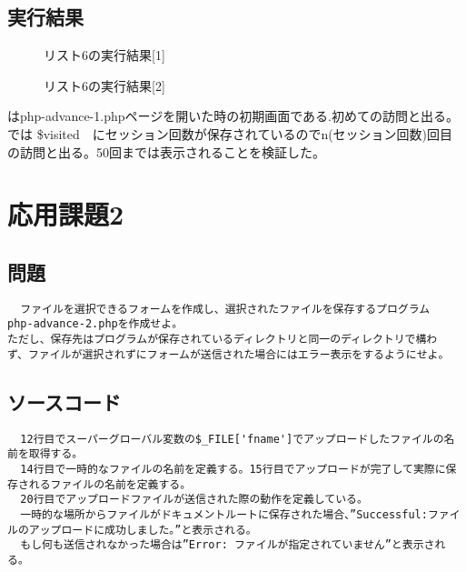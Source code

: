 \documentclass[a4j,10pt]{jsarticle}
\begin{document}
\subsection{実行結果}

\begin{figure}[H]
  \centering
  \caption{リスト6の実行結果[1]}
\label{fig:ad1}
\end{figure}

\begin{figure}[H]
  \centering
  \caption{リスト6の実行結果[2]}
\label{fig:ad2}
\end{figure}


はphp-advance-1.phpページを開いた時の初期画面である.初めての訪問と出る。
では \$visited　にセッション回数が保存されているのでn(セッション回数)回目の訪問と出る。50回までは表示されることを検証した。


\section{応用課題2}

\subsection{問題}

\begin{verbatim}
  ファイルを選択できるフォームを作成し、選択されたファイルを保存するプログラム
php-advance-2.phpを作成せよ。
ただし、保存先はプログラムが保存されているディレクトリと同一のディレクトリで構わ
ず、ファイルが選択されずにフォームが送信された場合にはエラー表示をするようにせよ。
\end{verbatim}
\subsection{ソースコード}


\begin{verbatim}
  12行目でスーパーグローバル変数の$_FILE['fname']でアップロードしたファイルの名前を取得する。
  14行目で一時的なファイルの名前を定義する。15行目でアップロードが完了して実際に保存されるファイルの名前を定義する。
  20行目でアップロードファイルが送信された際の動作を定義している。
  一時的な場所からファイルがドキュメントルートに保存された場合、”Successful:ファイルのアップロードに成功しました。”と表示される。
  もし何も送信されなかった場合は”Error: ファイルが指定されていません”と表示される。

\end{verbatim}
\end{document}
